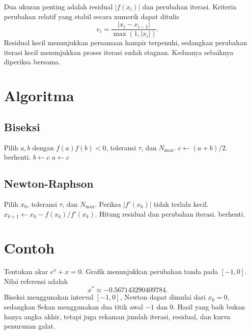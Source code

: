 \documentclass[book,english,noindex,lean,nobackpage,nocopyright,noupdate,nofiglist,notablist]{enacom}
\begin{document}
Dua ukuran penting adalah residual $|f(x_i)|$ dan perubahan iterasi. Kriteria perubahan relatif yang stabil secara numerik dapat ditulis
\begin{equation}
e_i=\frac{|x_i-x_{i-1}|}{\max(1,|x_i|)}.
\end{equation}
Residual kecil menunjukkan persamaan hampir terpenuhi, sedangkan perubahan iterasi kecil menunjukkan proses iterasi sudah stagnan. Keduanya sebaiknya diperiksa bersama.

\section{Algoritma}
\subsection{Biseksi}
\begin{algorithm}
\caption{Metode Biseksi}
\begin{algorithmic}[1]
\State Pilih $a,b$ dengan $f(a)f(b)<0$, toleransi $\tau$, dan $N_{\max}$.
\State $c\gets(a+b)/2$.
 \State berhenti. \EndIf
{} \State $b\gets c$ \Else \State $a\gets c$ \EndIf
\EndFor
\end{algorithmic}
\end{algorithm}

\subsection{Newton-Raphson}
\begin{algorithm}
\caption{Metode Newton-Raphson}
\begin{algorithmic}[1]
\State Pilih $x_0$, toleransi $\tau$, dan $N_{\max}$.
\State Periksa $|f'(x_k)|$ tidak terlalu kecil.
\State $x_{k+1}\gets x_k-f(x_k)/f'(x_k)$.
\State Hitung residual dan perubahan iterasi.
 \State berhenti. \EndIf
\EndFor
\end{algorithmic}
\end{algorithm}

\section{Contoh}
Tentukan akar $e^x+x=0$. Grafik menunjukkan perubahan tanda pada $[-1,0]$. Nilai referensi adalah
\begin{equation}
x^*\approx -0.567143290409784.
\end{equation}
Biseksi menggunakan interval $[-1,0]$, Newton dapat dimulai dari $x_0=0$, sedangkan Sekan menggunakan dua titik awal $-1$ dan $0$. Hasil yang baik bukan hanya angka akhir, tetapi juga rekaman jumlah iterasi, residual, dan kurva penurunan galat.
\end{document}
